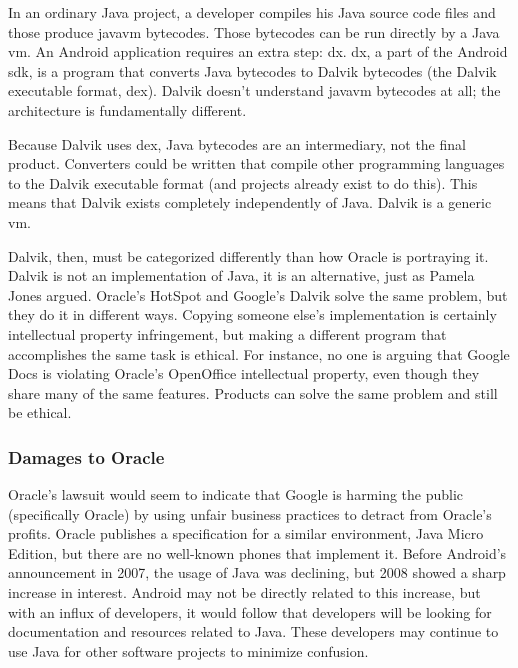\documentclass[11pt]{article}
\begin{document}
\begin{multicols}{2}
In an ordinary Java project, a developer compiles his Java source code files and
those produce \gls{javavm} \glspl{bytecode}.  Those \glspl{bytecode} can be run
directly by a Java \gls{vm}.  An Android application requires an extra step: dx.
dx, a part of the Android \gls{sdk}, is a program that converts Java
\glspl{bytecode} to Dalvik \glspl{bytecode} (the Dalvik executable format, dex).
Dalvik doesn't understand \gls{javavm} \glspl{bytecode} at all; the architecture
is fundamentally different.

Because Dalvik uses dex, Java \glspl{bytecode} are an intermediary, not the
final product.  Converters could be written that compile other programming
languages to the Dalvik executable format (and projects already exist to do
this).  This means that Dalvik exists completely independently of Java.  Dalvik
is a generic \gls{vm}.

Dalvik, then, must be categorized differently than how Oracle is portraying it.
Dalvik is not an implementation of Java, it is an alternative, just as Pamela
Jones argued. \cite{groklaw}  Oracle's HotSpot and Google's Dalvik solve the
same problem, but they do it in different ways.  Copying someone else's
implementation is certainly intellectual property infringement, but making a
different program that accomplishes the same task is ethical.  For instance, no
one is arguing that Google Docs is violating Oracle's OpenOffice intellectual
property, even though they share many of the same features.  Products can solve
the same problem and still be ethical.


\subsubsection{Damages to Oracle} %
\label{ssub:oracle-damage}

Oracle's lawsuit would seem to indicate that Google is harming the public
(specifically Oracle) by using unfair business practices to detract from
Oracle's profits.  Oracle publishes a specification for a similar environment,
Java Micro Edition, but there are no well-known phones that implement it.
Before Android's announcement in 2007, the usage of Java was declining, but 2008
showed a sharp increase in interest.  \cite{tiobe}  Android may not be directly
related to this increase, but with an influx of developers, it would follow that
developers will be looking for documentation and resources related to Java.
These developers may continue to use Java for other software projects to
minimize confusion.


\end{multicols}
\end{document}
